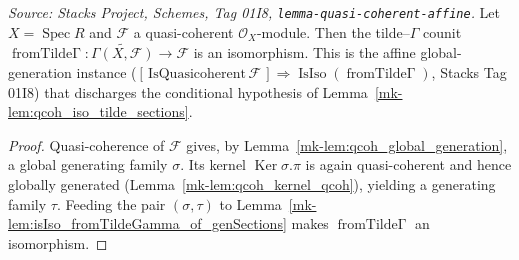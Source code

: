 \begin{lemma}
  \label{mk-lem:isIso_fromTildeGamma_of_quasicoherent}
  \textit{Source: Stacks Project, Schemes, Tag 01I8,
  \texttt{lemma-quasi-coherent-affine}.}
  Let \(X = \operatorname{Spec} R\) and \(\mathcal{F}\) a quasi-coherent
  \(\mathcal{O}_X\)-module. Then the tilde--\(\Gamma\) counit
  \(\operatorname{fromTilde\Gamma} : \widetilde{\Gamma(X, \mathcal{F})} \to \mathcal{F}\)
  is an isomorphism. This is the affine global-generation instance
  (\([{\,}\mathrm{IsQuasicoherent}\,\mathcal{F}{\,}] \Rightarrow
  \operatorname{IsIso}(\operatorname{fromTilde\Gamma})\), Stacks Tag 01I8) that
  discharges the conditional hypothesis of Lemma~\ref{mk-lem:qcoh_iso_tilde_sections}.
\end{lemma}
\begin{proof}
  Quasi-coherence of \(\mathcal{F}\) gives, by Lemma~\ref{mk-lem:qcoh_global_generation}, a
  global generating family \(\sigma\). Its kernel \(\operatorname{Ker} \sigma.\pi\) is
  again quasi-coherent and hence globally generated
  (Lemma~\ref{mk-lem:qcoh_kernel_qcoh}), yielding a generating family \(\tau\). Feeding the
  pair \((\sigma, \tau)\) to Lemma~\ref{mk-lem:isIso_fromTildeGamma_of_genSections} makes
  \(\operatorname{fromTilde\Gamma}\) an isomorphism.
\end{proof}

